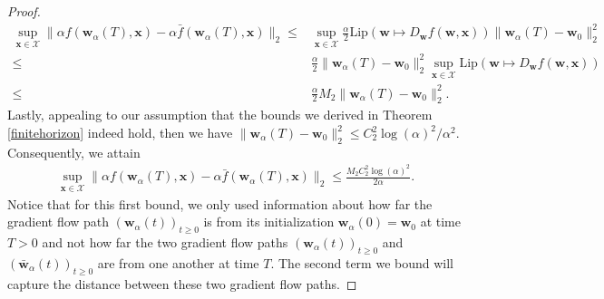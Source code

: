 \documentclass{article}
\begin{document}
\begin{proof}
\begin{align*}
    \sup_{\boldsymbol{x} \in \mathcal{X}} \| \alpha f(\boldsymbol{w}_{\alpha}(T), \boldsymbol{x}) - \alpha \bar{f}(\boldsymbol{w}_{\alpha}(T), \boldsymbol{x}) \|_2 \leq& \sup_{\boldsymbol{x} \in \mathcal{X}} \frac{\alpha}{2}\text{Lip}(\boldsymbol{w} \mapsto D_{\boldsymbol{w}}f(\boldsymbol{w}, \boldsymbol{x})) \|\boldsymbol{w}_{\alpha}(T) - \boldsymbol{w}_0 \|_2^2\\
    \leq& \frac{\alpha}{2}\|\boldsymbol{w}_{\alpha}(T) - \boldsymbol{w}_0 \|_2^2  \sup_{\boldsymbol{x} \in \mathcal{X}}\text{Lip}(\boldsymbol{w} \mapsto D_{\boldsymbol{w}}f(\boldsymbol{w}, \boldsymbol{x}))\\
    \leq& \frac{\alpha}{2}M_2\|\boldsymbol{w}_{\alpha}(T) - \boldsymbol{w}_0 \|_2^2.
\end{align*}
Lastly, appealing to our assumption that the bounds we derived in Theorem \ref{finitehorizon} indeed hold, then we have $\|\boldsymbol{w}_{\alpha}(T) - \boldsymbol{w}_0 \|_2^2 \leq C_2^2 \log(\alpha)^2/\alpha^2$. Consequently, we attain
\begin{align*}
    \sup_{\boldsymbol{x} \in \mathcal{X}} \| \alpha f(\boldsymbol{w}_{\alpha}(T), \boldsymbol{x}) - \alpha \bar{f}(\boldsymbol{w}_{\alpha}(T), \boldsymbol{x}) \|_2 \leq \frac{M_2C_2^2 \log(\alpha)^2}{2\alpha}.
\end{align*}
Notice that for this first bound, we only used information about how far the gradient flow path $(\boldsymbol{w}_{\alpha}(t))_{t \geq 0}$ is from its initialization $\boldsymbol{w}_{\alpha}(0) = \boldsymbol{w}_0$ at time $T > 0$ and not how far the two gradient flow paths $(\boldsymbol{w}_{\alpha}(t))_{t \geq 0}$ and $(\boldsymbol{\bar{w}}_{\alpha}(t))_{t \geq 0}$ are from one another at time $T$. The second term we bound will capture the distance between these two gradient flow paths.


\end{proof}
\end{document}
